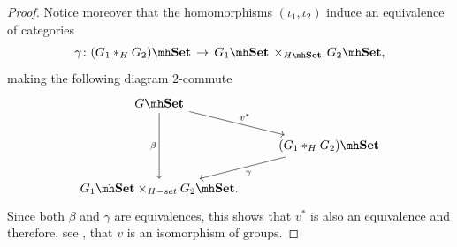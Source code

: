 \begin{proof}
Notice moreover that the homomorphisms $(\iota_1, \iota_2)$ induce an equivalence of categories
\[
\gamma \colon (G_1 *_H G_2)\mh\Set \, \to \, G_1\mh\Set \, \times_{H\mh\Set} \,G_2\mh\Set,
\]
making the following diagram $2$-commute
\[\begin{tikzcd}
	{G\mh\Set} \\
	& {(G_1 *_H G_2)\mh\Set} \\
	{G_1\mh\Set \times_{H-set} G_2\mh\Set.}
	\arrow["{v^*}", from=1-1, to=2-2]
	\arrow["\beta"', from=1-1, to=3-1]
	\arrow["\gamma", from=2-2, to=3-1]
\end{tikzcd}\]
Since both $\beta$ and $\gamma$ are equivalences, this shows that $v^*$ is also an equivalence and therefore, see \cite[Proposition 4.7.1]{Douady2020}, that $v$ is an isomorphism of groups.
\end{proof}